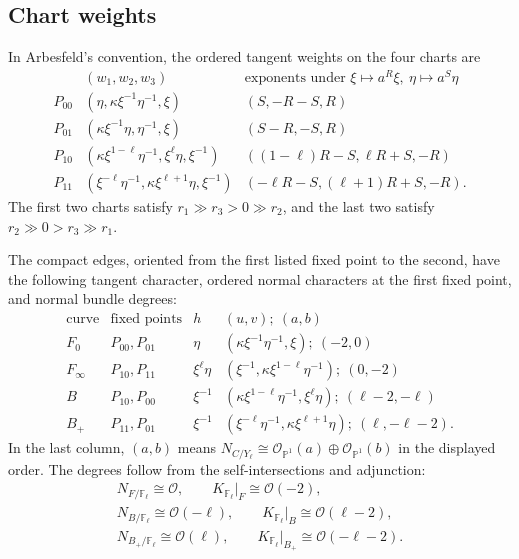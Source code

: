 \documentclass{amsart}
\theoremstyle{definition}
\numberwithin{equation}{section}
\newcommand{\cO}{\mathcal O}
\begin{document}
\subsection{Chart weights}
In Arbesfeld's convention, the ordered tangent weights on the four charts are
\begin{equation}
\begin{array}{c|c|c}
 & (w_1,w_2,w_3)&\text{exponents under }\xi\mapsto a^R\xi,
                                      \ \eta\mapsto a^S\eta\\ \hline
 P_{00}&(\eta,\kappa \xi^{-1}\eta^{-1},\xi)&(S,-R-S,R)\\
 P_{01}&(\kappa \xi^{-1}\eta,\eta^{-1},\xi)&(S-R,-S,R)\\
 P_{10}&(\kappa \xi^{1-\ell}\eta^{-1},\xi^\ell \eta,\xi^{-1})
        &((1-\ell)R-S,\ell R+S,-R)\\
 P_{11}&(\xi^{-\ell}\eta^{-1},\kappa \xi^{\ell+1}\eta,\xi^{-1})
        &(-\ell R-S,(\ell+1)R+S,-R).
\end{array}
\label{eq:Hirzebruch-four-chart-weights}
\end{equation}
The first two charts satisfy \(r_1\gg r_3>0\gg r_2\), and the last two satisfy \(r_2\gg0>r_3\gg r_1\).

The compact edges, oriented from the first listed fixed point to the second, have the following tangent character, ordered normal characters at the first fixed point, and normal bundle degrees:
\begin{equation}
\begin{array}{c|c|c|c}
\text{curve}&\text{fixed points}&h&(u,v);\ (a,b)\\ \hline
F_0&P_{00},P_{01}&\eta&(\kappa \xi^{-1}\eta^{-1},\xi);\ (-2,0)\\
F_\infty&P_{10},P_{11}&\xi^\ell \eta
 &(\xi^{-1},\kappa \xi^{1-\ell}\eta^{-1});\ (0,-2)\\
B&P_{10},P_{00}&\xi^{-1}
 &(\kappa \xi^{1-\ell}\eta^{-1},\xi^\ell \eta);\ (\ell-2,-\ell)\\
B_+&P_{11},P_{01}&\xi^{-1}
 &(\xi^{-\ell}\eta^{-1},\kappa \xi^{\ell+1}\eta);\ (\ell,-\ell-2).
\end{array}
\label{eq:Hirzebruch-four-edge-data}
\end{equation}
In the last column, \((a,b)\) means \(N_{C/Y_\ell}\cong \cO_{\mathbb P^1}(a)\oplus\cO_{\mathbb P^1}(b)\) in the displayed order.  The degrees follow from the self-intersections and adjunction:
\begin{equation}
\begin{gathered}
 N_{F/\mathbb F_\ell}\cong\cO,\qquad
 K_{\mathbb F_\ell}|_F\cong\cO(-2),\\
 N_{B/\mathbb F_\ell}\cong\cO(-\ell),\qquad
 K_{\mathbb F_\ell}|_B\cong\cO(\ell-2),\\
 N_{B_+/\mathbb F_\ell}\cong\cO(\ell),\qquad
 K_{\mathbb F_\ell}|_{B_+}\cong\cO(-\ell-2).
\end{gathered}
\label{eq:Hirzebruch-normal-bundle-degrees}
\end{equation}
\end{document}

